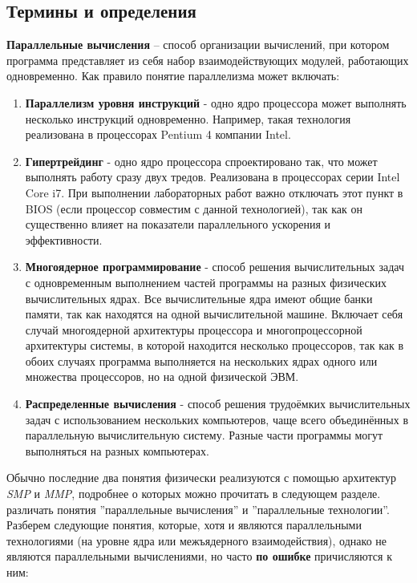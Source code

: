 { %
	\subsection{Термины и определения}
	\par\textbf{Параллельные вычисления} – 
способ организации вычислений, при котором программа представляет из себя набор взаимодействующих модулей, работающих одновременно. Как правило понятие параллелизма может включать:
		\begin{enumerate}
			\item\textbf{Параллелизм уровня инструкций} - одно ядро процессора может выполнять несколько инструкций одновременно. Например, такая технология реализована в процессорах Pentium 4 компании Intel.
			\item\textbf{Гипертрейдинг} - одно ядро процессора спроектировано так, что может выполнять работу сразу двух тредов. Реализована в процессорах серии Intel Core i7. При выполнении лабораторных работ важно отключать этот пункт в BIOS (если процессор совместим с данной технологией), так как он существенно влияет на показатели параллельного ускорения и эффективности.
			\item\textbf{Многоядерное программирование} -  способ решения вычислительных задач с одновременным выполнением частей программы на разных физических вычислительных ядрах. Все вычислительные ядра имеют общие банки памяти, так как находятся на одной вычислительной машине. Включает себя случай многоядерной архитектуры процессора и многопроцессорной архитектуры системы, в которой находится несколько процессоров, так как в обоих случаях программа выполняется на нескольких ядрах одного или множества процессоров, но на одной физической ЭВМ.
			\item\textbf{Распределенные вычисления} - способ решения трудоёмких вычислительных задач с использованием нескольких компьютеров, чаще всего объединённых в параллельную вычислительную систему. Разные части программы могут выполняться на разных компьютерах.
		\end{enumerate}
	Обычно последние два понятия физически реализуются с помощью архитектур \textit{SMP} и \textit{MMP}, подробнее о которых можно прочитать в следующем разделе.
	 различать понятия ''параллельные вычисления'' и ''параллельные технологии''. Разберем следующие понятия, которые, хотя и являются параллельными технологиями (на уровне ядра или межъядерного взаимодействия), однако не являются параллельными вычислениями, но часто \textbf{по ошибке} причисляются к ним:
		\begin{itemize}

\end{itemize}}
